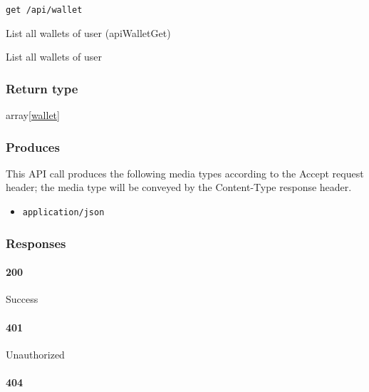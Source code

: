 \protect\hypertarget{apiWalletGet}{}{}

\begin{verbatim}
get /api/wallet
\end{verbatim}

List all wallets of user ({apiWalletGet})

List all wallets of user

\hypertarget{return-type-100}{%
\subsubsection{Return type}\label{return-type-100}}

array{[}\protect\hyperlink{wallet}{wallet}{]}

\hypertarget{produces-129}{%
\subsubsection{Produces}\label{produces-129}}

This API call produces the following media types according to the
{Accept} request header; the media type will be conveyed by the
{Content-Type} response header.

\begin{itemize}
\tightlist
\item
  \texttt{application/json}
\end{itemize}

\hypertarget{responses-132}{%
\subsubsection{Responses}\label{responses-132}}

\hypertarget{section-431}{%
\paragraph{200}\label{section-431}}

Success

\hypertarget{section-432}{%
\paragraph{401}\label{section-432}}

Unauthorized \protect\hyperlink{}{}

\hypertarget{section-433}{%
\paragraph{404}\label{section-433}}

